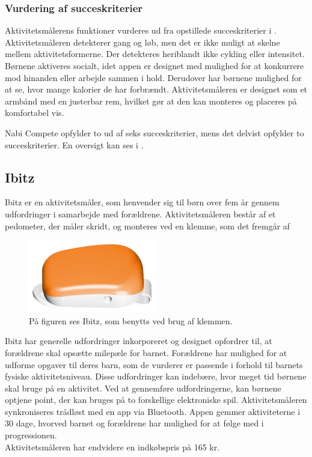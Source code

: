 \subsubsection{Vurdering af succeskriterier}
Aktivitetsmålerens funktioner vurderes ud fra opstillede succeskriterier i . \\
Aktivitetsmåleren detekterer gang og løb, men det er ikke muligt at skelne mellem aktivitetsformerne. Der detekteres heriblandt ikke cykling eller intensitet. Børnene aktiveres socialt, idet appen er designet med mulighed for at konkurrere mod hinanden eller arbejde sammen i hold. Derudover har børnene mulighed for %
at se, hvor mange kalorier de har forbrændt. Aktivitetsmåleren er designet som et armbånd med en justerbar rem, hvilket gør at den kan monteres og placeres på komfortabel vis.~\citep{Fuhu2015,Fuhu_tech2015}

Nabi Compete opfylder to ud af seks succeskriterier, mens det delvist opfylder to succeskriterier. En oversigt kan ses i .

\subsection{Ibitz}
Ibitz er en aktivitetsmåler, som henvender sig til børn over fem år gennem udfordringer i samarbejde med forældrene. Aktivitetsmåleren består af et pedometer, der måler skridt, og monteres ved en klemme, som det fremgår af~
\begin{figure}[H]
	\centering
	\includegraphics[scale=0.6]{figures/aProblemanalyse/ibitz.png}
	\caption{På figuren ses Ibitz, som benytts ved brug af klemmen. \citep{Ibitz_features2016}}
	\label{fig:ibitz}
\end{figure}\vspace{-.25cm}
Ibitz har generelle udfordringer inkorporeret og designet opfordrer til, at forældrene skal opsætte milepæle for barnet. Forældrene har mulighed for at udforme opgaver til deres barn, som de vurderer er passende i forhold til barnets fysiske aktivitetsniveau. Disse udfordringer kan indebære, hvor meget tid børnene skal bruge på en aktivitet. Ved at gennemføre udfordringerne, kan børnene optjene point, der kan bruges på to forskellige elektroniske spil. \newline 
Aktivitetsmåleren synkroniseres trådløst med en app via Bluetooth. Appen gemmer aktiviteterne i 30 dage, hvorved barnet og forældrene har mulighed for at følge med i progressionen.\\
Aktivitetsmåleren har endvidere en indkøbspris på 165 kr. \citep{Ibitz_features2016}

